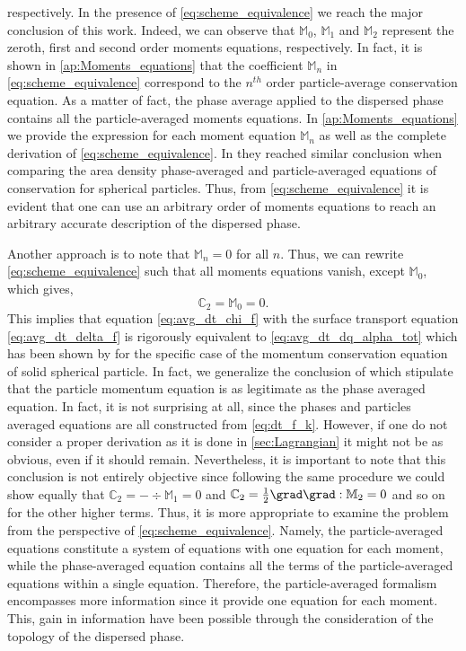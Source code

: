 respectively. 
In the presence of \ref{eq:scheme_equivalence} we reach the major conclusion of this work. 
Indeed, we can observe that $\mathbb{M}_0$, $\mathbb{M}_1$ and $\mathbb{M}_2$ represent the zeroth, first and second order moments equations, respectively. 
In fact, it is shown in \ref{ap:Moments_equations} that the coefficient $\mathbb{M}_n$ in \ref{eq:scheme_equivalence} correspond to the $n^{th}$ order particle-average conservation equation. 
As a matter of fact, the phase average applied to the dispersed phase contains all the particle-averaged moments equations.
In \ref{ap:Moments_equations} we provide the expression for each moment equation $\mathbb{M}_n$ as well as the complete derivation of \ref{eq:scheme_equivalence}. 
In \cite{lhuillier2000bilan} they reached similar conclusion when comparing the area density phase-averaged and particle-averaged equations of conservation for spherical particles. 
Thus, from \ref{eq:scheme_equivalence} it is evident that one can use an arbitrary order of moments equations to reach an arbitrary accurate description of the dispersed phase.

Another approach is to note that $\mathbb{M}_n=0$ for all $n$. Thus, we can rewrite \ref{eq:scheme_equivalence} such that all moments equations vanish, except $\mathbb{M}_0$, which gives, 
\begin{equation}
    \mathbb{C}_2 = \mathbb{M}_0 = 0.
\end{equation}
This implies that equation \ref{eq:avg_dt_chi_f} with the surface transport equation \ref{eq:avg_dt_delta_f} is rigorously equivalent to \ref{eq:avg_dt_dq_alpha_tot} which has been shown by \cite[Appendix A]{nott2011suspension} for the specific case of the momentum conservation equation of solid spherical particle.
In fact, we generalize the conclusion of \citet[Appendix A]{zhang1997momentum} which stipulate that the particle momentum equation is as legitimate as the phase averaged equation. 
In fact, it is not surprising at all, since the phases and particles averaged equations are all constructed from \ref{eq:dt_f_k}.
However, if one do not consider a proper derivation as it is done in \ref{sec:Lagrangian} it might not be as obvious, even if it should remain.
Nevertheless, it is important to note that this conclusion is not entirely objective since following the same procedure we could show equally that $\mathbb{C}_2  = -\div\mathbb{M}_1=0$ and $\mathbb{C}_2  = \frac{1}{2}\grad\grad:\mathbb{M}_2=0$ and so on for the other higher terms. 
Thus, it is more appropriate to examine the problem from the perspective of \ref{eq:scheme_equivalence}. 
Namely, the particle-averaged equations constitute a system of equations with one equation for each moment, while the phase-averaged equation contains all the terms of the particle-averaged equations within a single equation.
Therefore, the particle-averaged formalism encompasses more information since it provide one equation for each moment. 
This,  gain in information have been possible through the consideration of the topology of the dispersed phase. 

